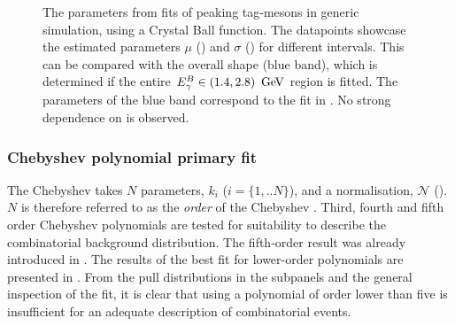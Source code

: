 \begin{figure}[hbtp!]
    \centering
    \caption{\label{fig:crystal_ball_par_test}The parameters from \Mbc fits of peaking tag-\B mesons in generic \BB simulation, using a Crystal Ball function.
    The datapoints showcase the estimated parameters $\mu$ () and $\sigma$ () for different
    \EB intervals.
    This can be compared with the overall shape (blue band), which is determined if the entire ${E^B_{\gamma}}\in(1.4,2.8)~\mathrm{\,Ge\kern -0.1em V}$ region is fitted.
    The parameters of the blue band correspond to the fit in .
    No strong dependence on \EB is observed.
    }
\end{figure}

\subsubsection{Chebyshev polynomial primary fit}\label{sec:chebyshev_prefit}

The Chebyshev \PDF takes $N$ parameters, $k_i$ ($i=\{1,..N\}$), and a normalisation, $\mathcal{N}$ ().
$N$ is therefore referred to as the \textit{order} of the Chebyshev \PDF.
Third, fourth and fifth order Chebyshev polynomials are tested for suitability to describe the combinatorial \BB background distribution.
The fifth-order result was already introduced in .
The results of the best fit for lower-order polynomials are presented in .
From the pull distributions in the subpanels and the general inspection of the fit, it is clear that using a polynomial of order lower than five is insufficient for an adequate description of combinatorial \BB events.

